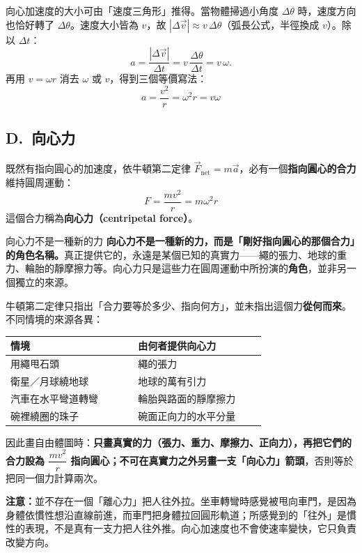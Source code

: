 \documentclass[11pt]{article}
\begin{document}
向心加速度的大小可由「速度三角形」推得。當物體掃過小角度 $\Delta\theta$ 時，速度方向也恰好轉了 $\Delta\theta$。速度大小皆為 $v$，故 $|\Delta\vec v|\approx v\,\Delta\theta$（弧長公式，半徑換成 $v$）。除以 $\Delta t$：
$$a=\frac{|\Delta\vec v|}{\Delta t}=v\,\frac{\Delta\theta}{\Delta t}=v\,\omega.$$
再用 $v=\omega r$ 消去 $\omega$ 或 $v$，得到三個等價寫法：
$$\boxed{\;a=\frac{v^2}{r}=\omega^2 r=v\omega\;}$$

\subsection*{\sffamily D.\ 向心力}

既然有指向圓心的加速度，依牛頓第二定律 $\vec F_{\text{net}}=m\vec a$，必有一個\textbf{指向圓心的合力}維持圓周運動：
$$\boxed{\;F=\frac{mv^2}{r}=m\omega^2 r\;}$$
這個合力稱為\textbf{向心力（centripetal force）}。

\begin{補充框}{向心力不是一種新的力}
\textbf{向心力不是一種新的力，而是「剛好指向圓心的那個合力」的角色名稱。}真正提供它的，永遠是某個已知的真實力——繩的張力、地球的重力、輪胎的靜摩擦力等。向心力只是這些力在圓周運動中所扮演的\textbf{角色}，並非另一個獨立的來源。

牛頓第二定律只指出「合力要等於多少、指向何方」，並未指出這個力\textbf{從何而來}。不同情境的來源各異：

\begin{center}
\renewcommand{\arraystretch}{1.25}
\begin{tabular}{p{0.42\linewidth} p{0.42\linewidth}}
\hline
\textbf{情境} & \textbf{由何者提供向心力} \\
\hline
用繩甩石頭 & 繩的張力 \\
衛星／月球繞地球 & 地球的萬有引力 \\
汽車在水平彎道轉彎 & 輪胎與路面的靜摩擦力 \\
碗裡繞圈的珠子 & 碗面正向力的水平分量 \\
\hline
\end{tabular}
\end{center}

因此畫自由體圖時：\textbf{只畫真實的力（張力、重力、摩擦力、正向力），再把它們的合力設為 $\dfrac{mv^2}{r}$ 指向圓心；不可在真實力之外另畫一支「向心力」箭頭}，否則等於把同一個力計算兩次。

\textbf{注意：}並不存在一個「離心力」把人往外拉。坐車轉彎時感覺被甩向車門，是因為身體依慣性想沿直線前進，而車門把身體拉回圓形軌道；所感覺到的「往外」是慣性的表現，不是真有一支力把人往外推。向心加速度也不會使速率變快，它只負責改變方向。
\end{補充框}
\end{document}
